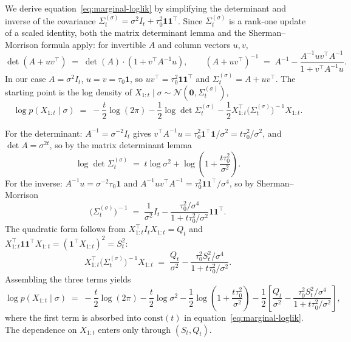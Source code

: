 \documentclass[11pt]{article}
\begin{document}
We derive equation~\eqref{eq:marginal-loglik} by simplifying the determinant and inverse of the covariance $\Sigma_t^{(\sigma)} = \sigma^2 I_t + \tau_0^2 \mathbf{1}\mathbf{1}^\top$. Since $\Sigma_t^{(\sigma)}$ is a rank-one update of a scaled identity, both the matrix determinant lemma and the Sherman--Morrison formula apply: for invertible $A$ and column vectors $u, v$,
\[
\det(A + uv^\top) \;=\; \det(A) \cdot (1 + v^\top A^{-1} u),
\qquad
(A + uv^\top)^{-1} \;=\; A^{-1} - \frac{A^{-1} u v^\top A^{-1}}{1 + v^\top A^{-1} u}.
\]
In our case $A = \sigma^2 I_t$, $u = v = \tau_0 \mathbf{1}$, so $u v^\top = \tau_0^2 \mathbf{1}\mathbf{1}^\top$ and $\Sigma_t^{(\sigma)} = A + uv^\top$. The starting point is the log density of $X_{1:t} \mid \sigma \sim \mathcal{N}(\mathbf{0}, \Sigma_t^{(\sigma)})$,
\[
\log p(X_{1:t} \mid \sigma) \;=\; -\frac{t}{2}\log(2\pi) - \frac{1}{2}\log\det\Sigma_t^{(\sigma)} - \frac{1}{2} X_{1:t}^\top\!\big(\Sigma_t^{(\sigma)}\big)^{\!-1} X_{1:t}.
\]

For the determinant: $A^{-1} = \sigma^{-2} I_t$ gives $v^\top A^{-1} u = \tau_0^2 \mathbf{1}^\top \mathbf{1}/\sigma^2 = t\tau_0^2/\sigma^2$, and $\det A = \sigma^{2t}$, so by the matrix determinant lemma
\[
\log\det\Sigma_t^{(\sigma)} \;=\; t\log\sigma^2 + \log\!\left(1 + \frac{t\tau_0^2}{\sigma^2}\right).
\]
For the inverse: $A^{-1} u = \sigma^{-2}\tau_0\mathbf{1}$ and $A^{-1} u v^\top A^{-1} = \tau_0^2 \mathbf{1}\mathbf{1}^\top/\sigma^4$, so by Sherman--Morrison
\[
\big(\Sigma_t^{(\sigma)}\big)^{\!-1} \;=\; \frac{1}{\sigma^2}I_t - \frac{\tau_0^2/\sigma^4}{1 + t\tau_0^2/\sigma^2}\mathbf{1}\mathbf{1}^\top.
\]
The quadratic form follows from $X_{1:t}^\top I_t X_{1:t} = Q_t$ and $X_{1:t}^\top \mathbf{1}\mathbf{1}^\top X_{1:t} = (\mathbf{1}^\top X_{1:t})^2 = S_t^2$:
\[
X_{1:t}^\top\!\big(\Sigma_t^{(\sigma)}\big)^{\!-1}\! X_{1:t} \;=\; \frac{Q_t}{\sigma^2} - \frac{\tau_0^2 S_t^2/\sigma^4}{1 + t\tau_0^2/\sigma^2}.
\]
Assembling the three terms yields
\[
\log p(X_{1:t} \mid \sigma) \;=\; -\frac{t}{2}\log(2\pi) - \frac{t}{2}\log\sigma^2 - \frac{1}{2}\log\!\left(1 + \frac{t\tau_0^2}{\sigma^2}\right) - \frac{1}{2}\!\left[\frac{Q_t}{\sigma^2} - \frac{\tau_0^2 S_t^2/\sigma^4}{1 + t\tau_0^2/\sigma^2}\right],
\]
where the first term is absorbed into $\mathrm{const}(t)$ in equation~\eqref{eq:marginal-loglik}. The dependence on $X_{1:t}$ enters only through $(S_t, Q_t)$.



\end{document}
